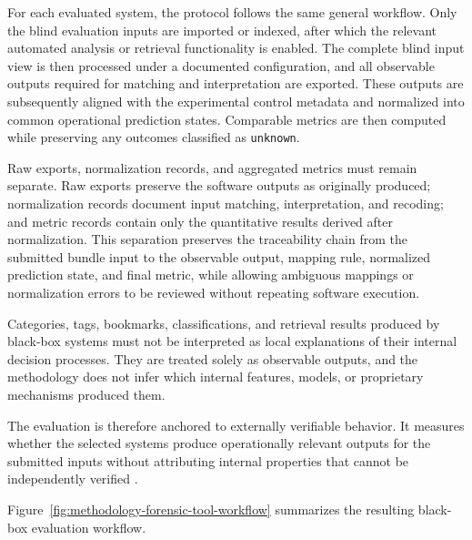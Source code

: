 For each evaluated system, the protocol follows the same general workflow. Only
the blind evaluation inputs are imported or indexed, after which the relevant
automated analysis or retrieval functionality is enabled. The complete blind
input view is then processed under a documented configuration, and all observable
outputs required for matching and interpretation are exported. These outputs are
subsequently aligned with the experimental control metadata and normalized into
common operational prediction states. Comparable metrics are then computed while
preserving any outcomes classified as \texttt{unknown}.


Raw exports, normalization records, and aggregated metrics must remain
separate. Raw exports preserve the software outputs as originally produced;
normalization records document input matching, interpretation, and recoding;
and metric records contain only the quantitative results derived after
normalization. This separation preserves the traceability chain from the
submitted bundle input to the observable output, mapping rule, normalized
prediction state, and final metric, while allowing ambiguous mappings or
normalization errors to be reviewed without repeating software execution.

Categories, tags, bookmarks, classifications, and retrieval results produced by
black-box systems must not be interpreted as local explanations of their
internal decision processes. They are treated solely as observable outputs, and
the methodology does not infer which internal features, models, or proprietary
mechanisms produced them.

The evaluation is therefore anchored to externally verifiable behavior. It
measures whether the selected systems produce operationally relevant outputs
for the submitted inputs without attributing internal properties that cannot
be independently verified
\cite{sanna2024preliminary,sanna2025pixelperfect}.

Figure~\ref{fig:methodology-forensic-tool-workflow} summarizes the resulting
black-box evaluation workflow.

